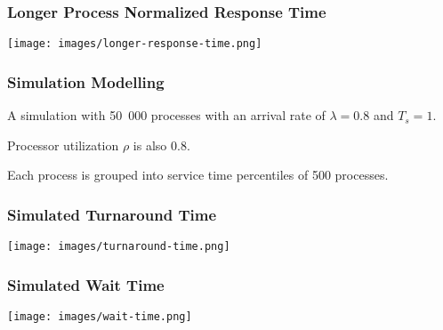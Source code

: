 \begin{frame}
\frametitle{Longer Process Normalized Response Time}

\begin{center}
	\texttt{[image: images/longer-response-time.png]}
\end{center}

\end{frame}



\begin{frame}
\frametitle{Simulation Modelling}

A simulation with 50~000 processes with an arrival rate of $\lambda = 0.8$ and $T_{s} = 1$. 

Processor utilization $\rho$ is also 0.8. 

Each process is grouped into service time percentiles of 500 processes. 

\end{frame}


\begin{frame}
\frametitle{Simulated Turnaround Time}

\begin{center}
	\texttt{[image: images/turnaround-time.png]}
\end{center}

\end{frame}

\begin{frame}
\frametitle{Simulated Wait Time}

\begin{center}
	\texttt{[image: images/wait-time.png]}
\end{center}

\end{frame}



